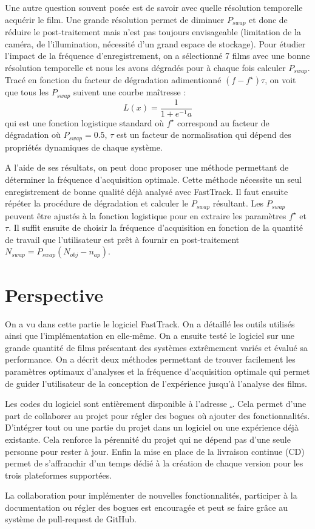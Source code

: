 	Une autre question souvent posée est de savoir avec quelle résolution temporelle acquérir le film. Une grande résolution permet de diminuer $P_{swap}$ et donc de réduire le post-traitement mais n'est pas toujours envisageable (limitation de la caméra, de l'illumination, nécessité d'un grand espace de stockage).
	Pour étudier l'impact de la fréquence d'enregistrement, on a sélectionné 7 films avec une bonne résolution temporelle et nous les avons dégradés pour à chaque fois calculer $P_{swap}$. Tracé en fonction du facteur de dégradation adimentionné $(f-f^{\star})\tau$, on voit que tous les $P_{swap}$ suivent une courbe maîtresse :
	$$
	    L(x)=\frac{1}{1+e^{-1}a}
	$$
	qui est une fonction logistique standard où $f^{\star}$ correspond au facteur de dégradation où $P_{swap}=0.5$, $\tau$ est un facteur de normalisation qui dépend des propriétés dynamiques de chaque système.

	
	A l'aide de ses résultats, on peut donc proposer une méthode permettant de déterminer la fréquence d'acquisition optimale. Cette méthode nécessite un seul enregistrement de bonne qualité déjà analysé avec FastTrack. Il faut ensuite répéter la procédure de dégradation et calculer le $P_{swap}$ résultant. Les $P_{swap}$ peuvent être ajustés à la fonction logistique pour en extraire les paramètres $f^{\star}$ et $\tau$. Il suffit ensuite de choisir la fréquence d'acquisition en fonction de la quantité de travail que l'utilisateur est prêt à fournir en post-traitement $N_{swap}=P_{swap}(N_{obj}-n_{ap})$.
	
\chapter{Perspective}

	On a vu dans cette partie le logiciel FastTrack. On a détaillé les outils utilisés ainsi que l'implémentation en elle-même. On a ensuite testé le logiciel sur une grande quantité de films présentant des systèmes extrêmement variés et évalué sa performance. On a décrit deux méthodes permettant de trouver facilement les paramètres optimaux d'analyses et la fréquence d'acquisition optimale qui permet de guider l'utilisateur de la conception de l'expérience jusqu'à l'analyse des films.

	
	Les codes du logiciel sont entièrement disponible à l'adresse \url{.}. Cela permet d'une part de collaborer au projet pour régler des bogues où ajouter des fonctionnalités. D'intégrer tout ou une partie du projet dans un logiciel ou une expérience déjà existante. Cela renforce la pérennité du projet qui ne dépend pas d'une seule personne pour rester à jour. Enfin la mise en place de la livraison continue (CD) permet de s'affranchir d'un temps dédié à la création de chaque version pour les trois plateformes supportées.

	
	La collaboration pour implémenter de nouvelles fonctionnalités, participer à la documentation ou régler des bogues est encouragée et peut se faire grâce au système de pull-request de GitHub.
	
	

